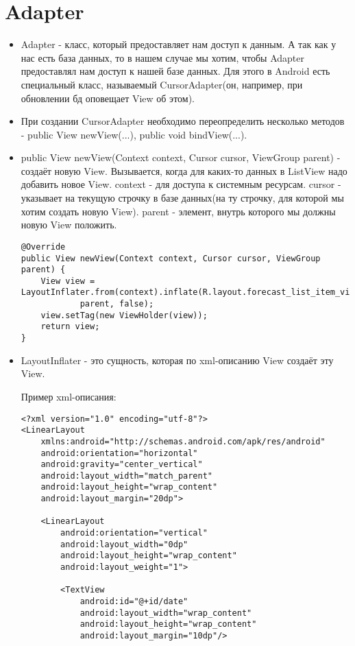 \documentclass[12 pt]{article}
\begin{document}
\section{Adapter}
    \begin{itemize}
        \item Adapter - класс, который предоставляет нам доступ к данным. А так как у нас есть база данных, то в нашем случае мы хотим, чтобы Adapter предоставлял нам доступ к нашей базе данных. Для этого в Android есть специальный класс, называемый CursorAdapter(он, например, при обновлении бд оповещает View об этом).
        \item При создании CursorAdapter необходимо переопределить несколько методов - public View newView(...), public void bindView(...).
        \item public View newView(Context context, Cursor cursor, ViewGroup parent) - создаёт новую View. Вызывается, когда для каких-то данных в ListView надо добавить новое View. context - для доступа к системным ресурсам. cursor - указывает на текущую строчку в базе данных(на ту строчку, для которой мы хотим создать новую View). parent - элемент, внутрь которого мы должны новую View положить.
        \begin{lstlisting}
@Override
public View newView(Context context, Cursor cursor, ViewGroup parent) {
    View view = LayoutInflater.from(context).inflate(R.layout.forecast_list_item_view,
            parent, false);
    view.setTag(new ViewHolder(view));
    return view;
}        
        \end{lstlisting}
        \item LayoutInflater - это сущность, которая по xml-описанию View создаёт эту View. 
        
        Пример xml-описания:
        \begin{lstlisting}
<?xml version="1.0" encoding="utf-8"?>
<LinearLayout
    xmlns:android="http://schemas.android.com/apk/res/android"
    android:orientation="horizontal"
    android:gravity="center_vertical"
    android:layout_width="match_parent"
    android:layout_height="wrap_content"
    android:layout_margin="20dp">

    <LinearLayout
        android:orientation="vertical"
        android:layout_width="0dp"
        android:layout_height="wrap_content"
        android:layout_weight="1">

        <TextView
            android:id="@+id/date"
            android:layout_width="wrap_content"
            android:layout_height="wrap_content"
            android:layout_margin="10dp"/>


\end{lstlisting}
\end{itemize}
\end{document}
